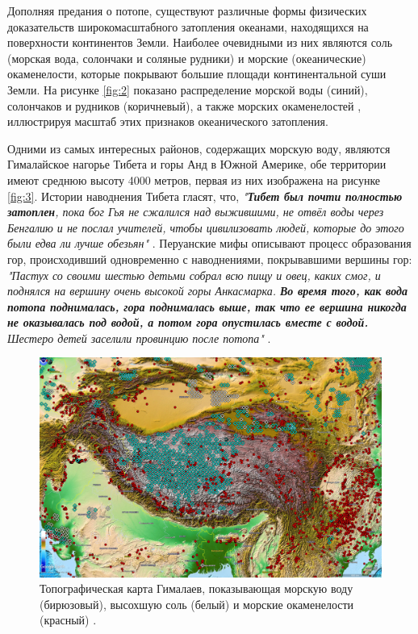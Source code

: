 \documentclass[10pt,twocolumn,letterpaper]{article}
\begin{document}
Дополняя предания о потопе, существуют различные формы физических доказательств широкомасштабного затопления океанами, находящихся на поверхности континентов Земли. Наиболее очевидными из них являются соль (морская вода, солончаки и соляные рудники) и морские (океанические) окаменелости, которые покрывают большие площади континентальной суши Земли. На рисунке \ref{fig:2} показано распределение морской воды (синий), солончаков и рудников (коричневый), а также морских окаменелостей \cite{15,16,86,87}, иллюстрируя масштаб этих признаков океанического затопления.

Одними из самых интересных районов, содержащих морскую воду, являются Гималайское нагорье Тибета и горы Анд в Южной Америке, обе территории имеют среднюю высоту 4000 метров, первая из них изображена на рисунке \ref{fig:3}. Истории наводнения Тибета гласят, что, \textit{"\textbf{Тибет был почти полностью затоплен}, пока бог Гья не сжалился над выжившими, не отвёл воды через Бенгалию и не послал учителей, чтобы цивилизовать людей, которые до этого были едва ли лучше обезьян"} \cite{3}. Перуанские мифы описывают процесс образования гор, происходивший одновременно с наводнениями, покрывавшими вершины гор: \textit{"Пастух со своими шестью детьми собрал всю пищу и овец, каких смог, и поднялся на вершину очень высокой горы Анкасмарка. \textbf{Во время того, как вода потопа поднималась, гора поднималась выше, так что ее вершина никогда не оказывалась под водой, а потом гора опустилась вместе с водой.} Шестеро детей заселили провинцию после потопа"} \cite{3}.

\begin{figure}[t]
\begin{center}
   \includegraphics[width=1\linewidth]{tibet.jpg}
\end{center}
   \caption{Топографическая карта Гималаев, показывающая морскую воду (бирюзовый), высохшую соль (белый) и морские окаменелости (красный) \cite{15,16,86,87}.}
\label{fig:3}
\label{fig:onecol}
\end{figure}
\end{document}
